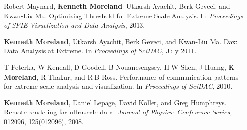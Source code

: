 \begin{enumerate}[label={[\arabic*]}, left=0pt]
\item  %
  Robert Maynard, \textbf{Kenneth Moreland}, Utkarsh Ayachit, Berk Geveci, and Kwan-Liu Ma.
  Optimizing Threshold for Extreme Scale Analysis.
  In \emph{Proceedings of SPIE Visualization and Data Analysis}, 2013.
\item  %
  \textbf{Kenneth Moreland}, Utkarsh Ayachit, Berk Geveci, and Kwan-Liu Ma.
  Dax: Data Analysis at Extreme.
  In \emph{Proceedings of SciDAC}, July 2011.
\item  %
  T Peterka, W Kendall, D Goodell, B Nouanesengsey, H-W Shen, J Huang, \textbf{K Moreland}, R Thakur, and R B Ross.
  Performance of communication patterns for extreme-scale analysis and visualization.
  In \emph{Proceedings of SciDAC}, 2010.
\item  %
  \textbf{Kenneth Moreland}, Daniel Lepage, David Koller, and Greg Humphreys.
  Remote rendering for ultrascale data.
  \emph{Journal of Physics: Conference Series}, 012096, 125(012096), 2008.
\end{enumerate}